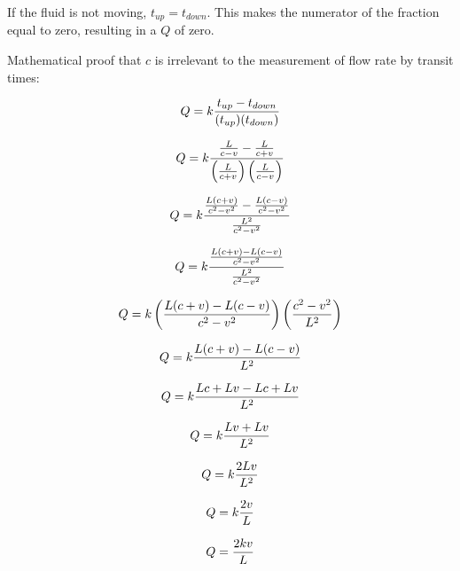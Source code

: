 If the fluid is not moving, $t_{up} = t_{down}$.  This makes the numerator of the fraction equal to zero, resulting in a $Q$ of zero.

\vskip 10pt

Mathematical proof that $c$ is irrelevant to the measurement of flow rate by transit times:

$$Q = k {t_{up} - t_{down} \over (t_{up})(t_{down})}$$

$$Q = k {{L \over c-v} - {L \over c+v} \over \left({L \over c+v}\right)  \left({L \over c-v}\right)}$$

$$Q = k {{L (c + v) \over c^2 - v^2} - {L (c - v) \over c^2 - v^2} \over {L^2 \over c^2 - v^2}}$$

$$Q = k {{L (c + v) - L (c - v) \over c^2 - v^2} \over {L^2 \over c^2 - v^2}}$$

$$Q = k \left({L (c + v) - L (c - v) \over c^2 - v^2}\right) \left({c^2 - v^2 \over L^2}\right) $$

$$Q = k {L (c + v) - L (c - v) \over L^2}$$

$$Q = k {Lc + Lv - Lc + Lv \over L^2}$$

$$Q = k {Lv + Lv \over L^2}$$

$$Q = k {2Lv \over L^2}$$

$$Q = k {2v \over L}$$

$$Q = {2kv \over L}$$




